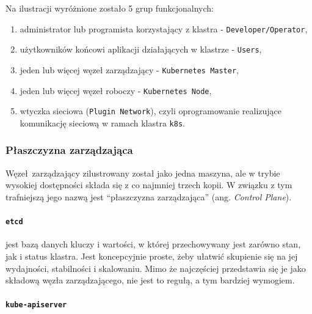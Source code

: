 \documentclass[a4paper,12pt,twoside,openany]{report}
\providecommand{\tightlist}{%
  \setlength{\itemsep}{0pt}\setlength{\parskip}{0pt}}
\newcommand{\passthrough}[1]{#1}
\begin{document}
Na ilustracji wyróżnione zostało 5 grup funkcjonalnych:

\begin{enumerate}
\def\labelenumi{\arabic{enumi}.}
\tightlist
\item
  administrator lub programista korzystający z klastra -
  \passthrough{\lstinline!Developer/Operator!},
\item
  użytkowników końcowi aplikacji działających w klastrze -
  \passthrough{\lstinline!Users!},
\item
  jeden lub więcej węzeł zarządzający -
  \passthrough{\lstinline!Kubernetes Master!},
\item
  jeden lub więcej węzeł roboczy -
  \passthrough{\lstinline!Kubernetes Node!},
\item
  wtyczka sieciowa (\passthrough{\lstinline!Plugin Network!}), czyli
  oprogramowanie realizujące komunikację sieciową w ramach klastra
  \passthrough{\lstinline!k8s!}.
\end{enumerate}

\hypertarget{pux142aszczyzna-zarzux105dzajux105ca}{%
\subsubsection{Płaszczyzna
zarządzająca}\label{pux142aszczyzna-zarzux105dzajux105ca}}

Węzeł~zarządzający zilustrowany został jako jedna maszyna, ale w trybie
wysokiej dostępności składa się z co najmniej trzech kopii. W związku z
tym trafniejszą jego nazwą jest ``płaszczyzna zarządzająca'' (ang.
\emph{Control Plane}).

\hypertarget{etcd}{%
\paragraph{\texorpdfstring{\texttt{etcd}}{etcd}}\label{etcd}}

jest bazą danych kluczy i wartości, w której przechowywany jest zarówno
stan, jak i status klastra. Jest koncepcyjnie proste, żeby ułatwić
skupienie się na jej wydajności, stabilności i skalowaniu. Mimo że
najczęściej przedstawia się je jako składową węzła zarządzającego, nie
jest to regułą, a tym bardziej wymogiem.

\hypertarget{kube-apiserver}{%
\paragraph{\texorpdfstring{\texttt{kube-apiserver}}{kube-apiserver}}\label{kube-apiserver}}
\end{document}
